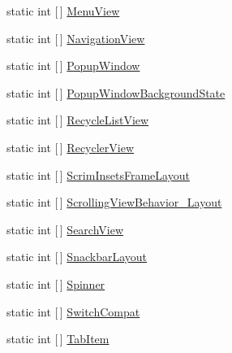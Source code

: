 \begin{DoxyCompactItemize}
static int \mbox{[}$\,$\mbox{]} \mbox{\hyperlink{class_f_w_p_s___app_1_1_droid_1_1_resource_1_1_styleable_a5e77d87c9ee37db3caa3cc04ab9263d0}{Menu\+View}}
\item 
static int \mbox{[}$\,$\mbox{]} \mbox{\hyperlink{class_f_w_p_s___app_1_1_droid_1_1_resource_1_1_styleable_a78a8a5d36d275b2c6749aa0532f0d13b}{Navigation\+View}}
\item 
static int \mbox{[}$\,$\mbox{]} \mbox{\hyperlink{class_f_w_p_s___app_1_1_droid_1_1_resource_1_1_styleable_af7fc34f9dc4e86b283d6e83ca313147a}{Popup\+Window}}
\item 
static int \mbox{[}$\,$\mbox{]} \mbox{\hyperlink{class_f_w_p_s___app_1_1_droid_1_1_resource_1_1_styleable_a41146959da073a264a928926dbf2df0b}{Popup\+Window\+Background\+State}}
\item 
static int \mbox{[}$\,$\mbox{]} \mbox{\hyperlink{class_f_w_p_s___app_1_1_droid_1_1_resource_1_1_styleable_ae028dabfd51c1909f922317dfe88d232}{Recycle\+List\+View}}
\item 
static int \mbox{[}$\,$\mbox{]} \mbox{\hyperlink{class_f_w_p_s___app_1_1_droid_1_1_resource_1_1_styleable_a74d13ab47bd1cfe4c949f8302c978589}{Recycler\+View}}
\item 
static int \mbox{[}$\,$\mbox{]} \mbox{\hyperlink{class_f_w_p_s___app_1_1_droid_1_1_resource_1_1_styleable_a3e74642e8bc25142b53d64bf072ab6ce}{Scrim\+Insets\+Frame\+Layout}}
\item 
static int \mbox{[}$\,$\mbox{]} \mbox{\hyperlink{class_f_w_p_s___app_1_1_droid_1_1_resource_1_1_styleable_a6d6b046378dbbf7d744bfceaa46546fd}{Scrolling\+View\+Behavior\+\_\+\+Layout}}
\item 
static int \mbox{[}$\,$\mbox{]} \mbox{\hyperlink{class_f_w_p_s___app_1_1_droid_1_1_resource_1_1_styleable_a34316a2d82d87daa3f5c088d532812eb}{Search\+View}}
\item 
static int \mbox{[}$\,$\mbox{]} \mbox{\hyperlink{class_f_w_p_s___app_1_1_droid_1_1_resource_1_1_styleable_a404d2fcdf0b6f8d5e169487832764c12}{Snackbar\+Layout}}
\item 
static int \mbox{[}$\,$\mbox{]} \mbox{\hyperlink{class_f_w_p_s___app_1_1_droid_1_1_resource_1_1_styleable_adfc7edaeb45e779a568b8ef8afbd847d}{Spinner}}
\item 
static int \mbox{[}$\,$\mbox{]} \mbox{\hyperlink{class_f_w_p_s___app_1_1_droid_1_1_resource_1_1_styleable_a38281a20496461de2935e730fc87c591}{Switch\+Compat}}
\item 
static int \mbox{[}$\,$\mbox{]} \mbox{\hyperlink{class_f_w_p_s___app_1_1_droid_1_1_resource_1_1_styleable_adeece924f617d59eeab8b0058794fb3c}{Tab\+Item}}

\end{DoxyCompactItemize}
